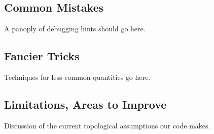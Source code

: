 \documentclass[10pt]{article}%
\begin{document}
\subsection*{Common Mistakes}

A panoply of debugging hints should go here.

\subsection*{Fancier Tricks}

Techniques for less common quantities go here.

\subsection*{Limitations, Areas to Improve}

Discussion of the current topological assumptions our code makes.
    

%
\end{document}
